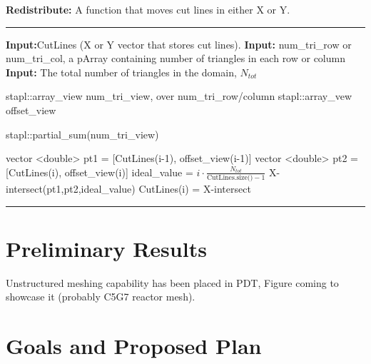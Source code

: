 \documentclass[11pt, letterpaper,titlepage,oneside]{article}
\begin{document}
\noindent\begin{minipage}{\textwidth}
\textbf{Redistribute:} A function that moves cut lines in either X or Y. \\
\rule{\textwidth}{0.4pt}
\begin{algorithmic}
\STATE \textbf{Input:}CutLines (X or Y vector that stores cut lines). 
\STATE \textbf{Input:} num\_tri\_row or num\_tri\_col, a pArray containing number of triangles in each row or column 
\STATE \textbf{Input:} The total number of triangles in the domain, $N_{tot}$

\STATE stapl::array\_view num\_tri\_view, over num\_tri\_row/column
\STATE stapl::array\_vew offset\_view

\STATE stapl::partial\_sum(num\_tri\_view) 



	\STATE vector <double> pt1 = [CutLines(i-1), offset\_view(i-1)]
	\STATE vector <double> pt2 = [CutLines(i), offset\_view(i)]
	\STATE ideal\_value = $i\cdot \frac{N_{tot}}{\text{CutLines.size()}-1}$
	\STATE X-intersect(pt1,pt2,ideal\_value) 
	\STATE CutLines(i) = X-intersect
\ENDFOR
\end{algorithmic}
\rule{\textwidth}{0.4pt}
\end{minipage}


\section{Preliminary Results}

Unstructured meshing capability has been placed in PDT, Figure coming to showcase it (probably C5G7 reactor mesh). 

\section{Goals and Proposed Plan}
\end{document}
